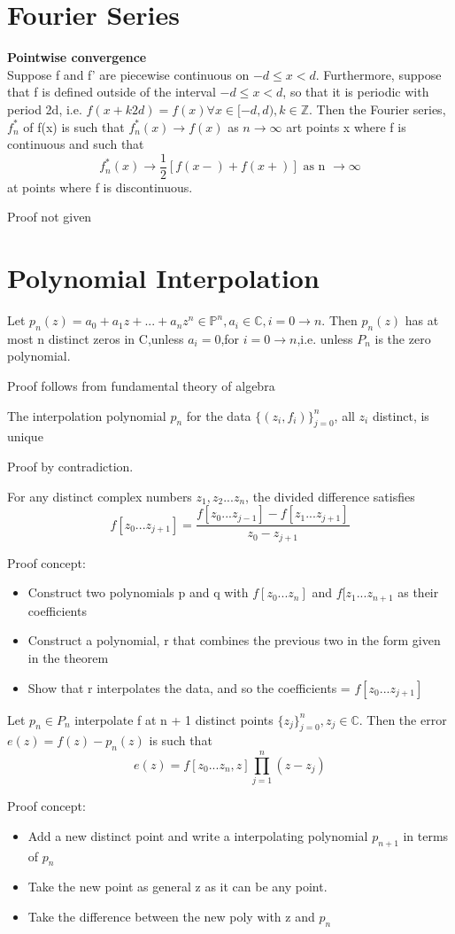 \documentclass{article}
\begin{document}
\section{Fourier Series}
\begin{theorem} \textbf{Pointwise convergence} \\

Suppose f and f' are piecewise continuous on $-d \leq x < d$. Furthermore, suppose that f is defined outside of the interval $-d \leq x < d$, so that it is periodic with period 2d, i.e. $f(x + k2d) = f(x) \forall x \in [-d, d), k \in \mathbb{Z}$. Then the Fourier series, $f_n^*$ of f(x) is such that $f_n^*(x) \to f(x)$ as $n \to \infty$ art points x where f is continuous and such that $$
f_n^*(x) \to \frac{1}{2}[f(x-) + f(x+)] \text{ as n } \to \infty$$
at points where f is discontinuous.
\end{theorem}
Proof not given
\section{Polynomial Interpolation}
\begin{theorem}
Let $p_n(z) = a_0 + a_1z + ... + a_nz^n \in \mathbb{P}^n, a_i \in \mathbb{C}, i = 0 \to n$. Then $p_n(z)$ has at most n distinct zeros in C,unless $a_i =0$,for $i=0 \to n$,i.e. unless $P_n$ is the zero polynomial.
\end{theorem}
Proof follows from fundamental theory of algebra
\begin{theorem}
The interpolation polynomial $p_n$ for the data $\{(z_i, f_i) \}^n_{j=0}$, all $z_i$ distinct, is unique
\end{theorem}
Proof by contradiction.
\begin{theorem}
For any distinct complex numbers $z_1, z_2 ... z_n$, the divided difference satisfies $$
f[z_0 ... z_{j+1}] = \frac{f[z_0 ... z_{j-1}] - f[z_1 ... z_{j+1}]}{z_0 - z_{j+1}}
$$
\end{theorem}
Proof concept:
\begin{itemize}
    \item Construct two polynomials p and q with $f[z_0...z_n]$ and $f[z_1...z_{n+1}$ as their coefficients
    \item Construct a polynomial, r that combines the previous two in the form given in the theorem
    \item Show that r interpolates the data, and so the coefficients = $f[z_0...z_{j+1}]$
\end{itemize}
\begin{theorem}
Let $p_n \in P_n$ interpolate f at n + 1 distinct points $\{z_j \}^n_{j=0}, z_j \in \mathbb{C}$. Then the error $e(z) = f(z) - p_n(z)$ is such that
$$
e(z) = f[z_0 ... z_n, z]\prod_{j=1}^n (z - z_j)
$$
\end{theorem}
Proof concept:
\begin{itemize}
    \item Add a new distinct point and write a interpolating polynomial $p_{n+1}$ in terms of $p_n$
    \item Take the new point as general z as it can be any point.
    \item Take the difference between the new poly with z and $p_n$
\end{itemize}
\end{document}
